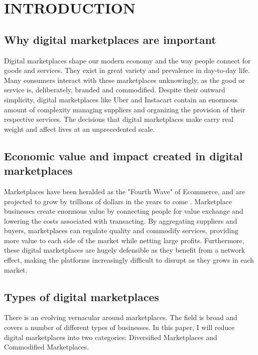 \addchapheadtotoc
\chapter{INTRODUCTION}

\section{Why digital marketplaces are important}
Digital marketplaces shape our modern economy and the way people connect for goods and services. They exist in great variety and prevalence in day-to-day life. Many consumers interact with these marketplaces unknowingly, as the good or service is, deliberately, branded and commodified. Despite their outward simplicity, digital marketplaces like Uber and Instacart contain an enormous amount of complexity managing suppliers and organizing the provision of their respective services. The decisions that digital marketplaces make carry real weight and affect lives at an unprecedented scale.

\section{Economic value and impact created in digital marketplaces}
Marketplaces have been heralded as the "Fourth Wave" of Ecommerce, and are projected to grow by trillions of dollars in the years to come \citep{marketplaceBoom}. Marketplace businesses create enormous value by connecting people for value exchange and lowering the costs associated with transacting. By aggregating suppliers and buyers, marketplaces can regulate quality and commodify services, providing more value to each side of the market while netting large profits. Furthermore, these digital marketplaces are hugely defensible as they benefit from a network effect, making the platforms increasingly difficult to disrupt as they grows in each market.

\section{Types of digital marketplaces}

There is an evolving vernacular around marketplaces. The field is broad and covers a number of different types of businesses. In this paper, I will reduce digital marketplaces into two categories: Diversified Marketplaces and Commodified Marketplaces. 

